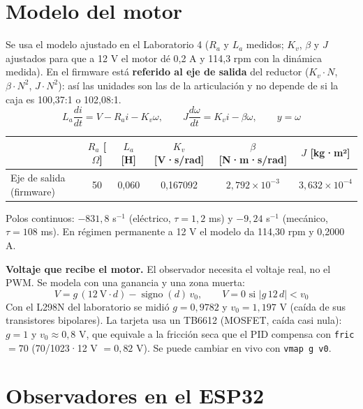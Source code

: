 \documentclass[11pt]{article}
\newcommand{\cod}[1]{\texttt{#1}}
\begin{document}
\section{Modelo del motor}

Se usa el modelo ajustado en el Laboratorio 4 ($R_a$ y $L_a$ medidos; $K_v$, $\beta$ y $J$ ajustados para que a 12 V el motor dé 0,2 A y 114,3 rpm con la dinámica medida). En el firmware está \textbf{referido al eje de salida} del reductor ($K_v\cdot N$, $\beta\cdot N^2$, $J\cdot N^2$): así las unidades son las de la articulación y no depende de si la caja es 100,37:1 o 102,08:1.
\begin{equation}
L_a\frac{di}{dt}=V-R_a i-K_v\omega,\qquad J\frac{d\omega}{dt}=K_v i-\beta\omega,\qquad y=\omega
\end{equation}

\begin{table}[H]\centering\small
\begin{tabular}{lccccc}
\toprule
 & $R_a$ [$\Omega$] & $L_a$ [H] & $K_v$ [V·s/rad] & $\beta$ [N·m·s/rad] & $J$ [kg·m²] \\
\midrule
Eje de salida (firmware) & 50 & 0,060 & 0,167092 & $2{,}792\times10^{-3}$ & $3{,}632\times10^{-4}$ \\
\bottomrule
\end{tabular}
\end{table}

Polos continuos: $-831{,}8$ s$^{-1}$ (eléctrico, $\tau=1{,}2$ ms) y $-9{,}24$ s$^{-1}$ (mecánico, $\tau=108$ ms). En régimen permanente a 12 V el modelo da 114,30 rpm y 0,2000 A.

\textbf{Voltaje que recibe el motor.} El observador necesita el voltaje real, no el PWM. Se modela con una ganancia y una zona muerta:
\begin{equation}
V = g\,(12\ \text{V}\cdot d) - \operatorname{signo}(d)\,v_0,\qquad V=0 \text{ si } |g\,12\,d|<v_0
\end{equation}
Con el L298N del laboratorio se midió $g=0{,}9782$ y $v_0=1{,}197$ V (caída de sus transistores bipolares). La tarjeta usa un TB6612 (MOSFET, caída casi nula): $g=1$ y $v_0\approx0{,}8$ V, que equivale a la fricción seca que el PID compensa con \cod{fric} $=70$ (70/1023·12 V $=0{,}82$ V). Se puede cambiar en vivo con \cod{vmap g v0}.

\section{Observadores en el ESP32}
\end{document}
